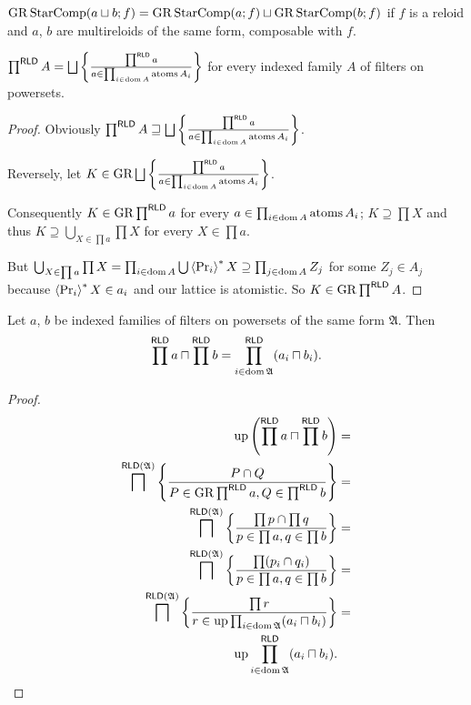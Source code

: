 \begin{conjecture}
$\operatorname{GR}\operatorname{StarComp}(a\sqcup b;f)=\operatorname{GR}\operatorname{StarComp}(a;f)\sqcup\operatorname{GR}\operatorname{StarComp}(b;f)$
if $f$ is a reloid and $a$, $b$ are multireloids of the same form,
composable with $f$.\end{conjecture}
\begin{thm}
$\prod^{\mathsf{RLD}}A=\bigsqcup\left\{ \frac{\prod^{\mathsf{RLD}}a}{a\in\prod_{i\in\operatorname{dom} A}\operatorname{atoms} A_{i}}\right\}$
for every indexed family $A$ of filters on powersets.\end{thm}
\begin{proof}
Obviously $\prod^{\mathsf{RLD}}A\sqsupseteq\bigsqcup\left\{ \frac{\prod^{\mathsf{RLD}}a}{a\in\prod_{i\in\operatorname{dom} A}\operatorname{atoms} A_{i}}\right\}$.

Reversely, let $K\in\operatorname{GR}\bigsqcup\left\{ \frac{\prod^{\mathsf{RLD}}a}{a\in\prod_{i\in\operatorname{dom} A}\operatorname{atoms} A_{i}}\right\}$.

Consequently $K\in\operatorname{GR}\prod^{\mathsf{RLD}}a$ for every $a\in\prod_{i\in\operatorname{dom} A}\operatorname{atoms} A_{i}$;
$K\supseteq\prod X$ and thus $K\supseteq\bigcup_{X\in\prod a}\prod X$
for every $X\in\prod a$.

But $\bigcup_{X\in\prod a}\prod X=\prod_{i\in\operatorname{dom} A}\bigcup\left\langle \Pr_{i}\right\rangle ^{\ast}X\supseteq\prod_{j\in\operatorname{dom} A}Z_{j}$
for some $Z_{j}\in A_{j}$ because $\left\langle \Pr_{i}\right\rangle ^{\ast}X\in a_{i}$
and our lattice is atomistic. So $K\in\operatorname{GR}\prod^{\mathsf{RLD}}A$.\end{proof}
\begin{thm}
Let $a$, $b$ be indexed families of filters on powersets of the
same form $\mathfrak{A}$. Then 
\[
\prod^{\mathsf{RLD}}a\sqcap\prod^{\mathsf{RLD}}b=\prod_{i\in\operatorname{dom}\mathfrak{A}}^{\mathsf{RLD}}(a_{i}\sqcap b_{i}).
\]
\end{thm}
\begin{proof}
~
\begin{align*}
\operatorname{up}\left(\prod^{\mathsf{RLD}}a\sqcap\prod^{\mathsf{RLD}}b\right) & =\\
\bigsqcap^{\mathsf{RLD}(\mathfrak{A})}\left\{ \frac{P\cap Q}{P\in\operatorname{GR}\prod^{\mathsf{RLD}}a,Q\in\prod^{\mathsf{RLD}}b}\right\} & =\\
\bigsqcap^{\mathsf{RLD}(\mathfrak{A})}\left\{ \frac{\prod p\cap\prod q}{p\in\prod a,q\in\prod b}\right\} & =\\
\bigsqcap^{\mathsf{RLD}(\mathfrak{A})}\left\{ \frac{\prod(p_{i}\cap q_{i})}{p\in\prod a,q\in\prod b}\right\} & =\\
\bigsqcap^{\mathsf{RLD}(\mathfrak{A})}\left\{ \frac{\prod r}{r\in\operatorname{up}\prod_{i\in\operatorname{dom}\mathfrak{A}}(a_{i}\sqcap b_{i})}\right\} & =\\
\operatorname{up}\prod_{i\in\operatorname{dom}\mathfrak{A}}^{\mathsf{RLD}}(a_{i}\sqcap b_{i}).
\end{align*}
\end{proof}
